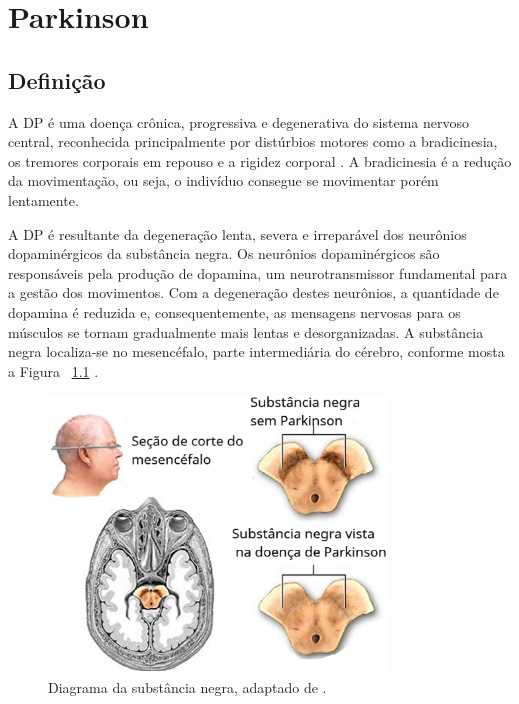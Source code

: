 \chapter{Parkinson}
\section{Definição}

A DP é uma doença crônica, progressiva e degenerativa do sistema nervoso central, reconhecida principalmente por distúrbios motores como a bradicinesia, os tremores corporais em repouso e a rigidez corporal \cite{da2016aspectos}. A bradicinesia é a redução da movimentação, ou seja, o indivíduo consegue se movimentar porém lentamente. 

A DP é resultante da degeneração lenta, severa e irreparável dos neurônios dopaminérgicos da substância negra. Os neurônios dopaminérgicos são responsáveis pela produção de dopamina, um neurotransmissor fundamental para a gestão dos movimentos. Com a degeneração destes neurônios, a quantidade de dopamina é reduzida e, consequentemente, as mensagens nervosas para os músculos se tornam gradualmente mais lentas e desorganizadas. A substância negra localiza-se no mesencéfalo, parte intermediária do cérebro, conforme mosta a Figura ~\ref{substanciaNegra} \cite{eftaxias2015detection}.

\begin{figure}[!htb]
	\centering
	\includegraphics[width=0.8\textwidth]{figuras/subNegra.eps}
	\caption{Diagrama da substância negra, adaptado de .}
	\label{substanciaNegra}
\end{figure}

